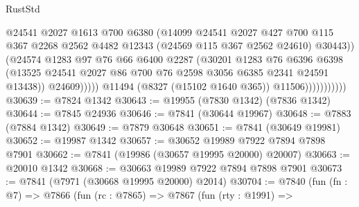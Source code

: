 \begin{lexlean}{RustStd}
\begin{coremodule}
{\begin{coremodule}
{{{{{{{{{{{{{{{{{{{{{{{{{{{{{{{{{{{{{{{{{{{{{{{{{{{{{{                                    @24541
                                    @2027
                                    @1613
                                    @700
                                    @6380
                                    (@14099
                                      @24541
                                      @2027
                                      @427
                                      @700
                                      @115
                                      @367
                                      @2268
                                      @2562
                                      @4482
                                      @12343
                                      (@24569 @115 @367 @2562 @24610)
                                      @30443))
                                  (@24574
                                    @1283
                                    @97
                                    @76
                                    @66
                                    @6400
                                    @2287
                                    (@30201
                                      @1283
                                      @76
                                      @6396
                                      @6398
                                      (@13525
                                        @24541
                                        @2027
                                        @86
                                        @700
                                        @76
                                        @2598
                                        @3056
                                        @6385
                                        @2341
                                        @24591
                                        @13438))
                                    @24609)))))
                          @11494
                          (@8327 (@15102 @1640 @365))
                          @11506)))))))))))
@30639 := @7824 @1342
@30643 := @19955 (@7830 @1342) (@7836 @1342)
@30644 := @7845 @24936
@30646 := @7841 (@30644 @19967)
@30648 := @7883 (@7884 @1342)
@30649 := @7879 @30648
@30651 := @7841 (@30649 @19981)
@30652 := @19987 @1342
@30657 := @30652 @19989 @7922 @7894 @7898 @7901
@30662 := @7841 (@19986 (@30657 @19995 @20000) @20007)
@30663 := @20010 @1342
@30668 := @30663 @19989 @7922 @7894 @7898 @7901
@30673 := @7841 (@7971 (@30668 @19995 @20000) @2014)
@30704 := @7840
    (fun (fn : @7) =>
    @7866
      (fun (rc : @7865) =>
      @7867
        (fun (rty : @1991) =>
}}}}}}}}}}}}}}}}}}}}}}}}}}}}}}}}}}}}}}}}}}}}}}}}}}}}}}
\end{coremodule}}
\end{coremodule}
\end{lexlean}
